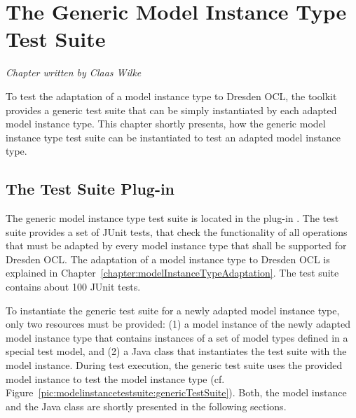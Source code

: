 \chapter{The Generic Model Instance Type Test Suite}
\label{chapter:modelInstanceTestSuite}

\begin{flushright}
\textit{Chapter written by Claas Wilke}
\end{flushright}

To test the adaptation of a model instance type to Dresden OCL, the toolkit
provides a generic test suite that can be simply instantiated by each adapted 
model instance type. This chapter shortly presents, how the generic model
instance type test suite can be instantiated to test an adapted model 
instance type.



\section{The Test Suite Plug-in}

The generic model instance type test suite is located in the plug-in
.
The test suite provides a set of JUnit tests, that check the functionality of
all operations that must be adapted by every model instance type that
shall be supported for Dresden OCL. The adaptation of a model instance type
to Dresden OCL is explained in Chapter~\ref{chapter:modelInstanceTypeAdaptation}.  
The test suite contains about 100 JUnit tests.

To instantiate the generic test suite for a newly adapted model instance type,
only two resources must be provided: (1) a model instance of the newly adapted 
model instance type that contains instances of a set of model types defined in a
special test model, and (2) a Java class that instantiates the test suite with 
the model instance. During test execution, the generic test suite uses the
provided model instance to test the model instance type (cf. 
Figure~\ref{pic:modelinstancetestsuite:genericTestSuite}). Both, the model
instance and the Java class are shortly presented in the following sections.

